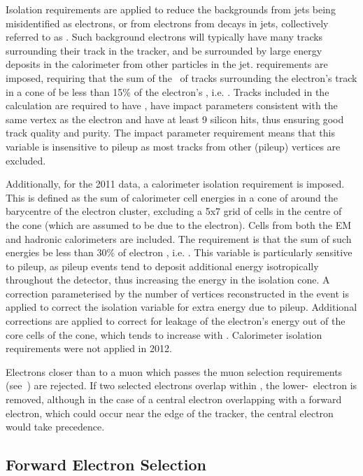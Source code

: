 Isolation requirements are applied to reduce the backgrounds from jets being
misidentified as electrons, or from electrons from decays in jets, collectively
referred to as . Such background electrons will
typically have many tracks surrounding their track in the tracker, and be
surrounded by large energy deposits in the calorimeter from other particles in
the jet.  requirements are imposed, requiring that the
sum of the \pt\ of tracks surrounding the electron's track in a cone of
 be less than 15\% of the electron's \pt, i.e.
. Tracks included in the calculation are required to have
, have impact parameters consistent with the same vertex as the
electron and have at least 9 silicon hits, thus ensuring good track quality and
purity. The impact parameter requirement means that this variable is insensitive
to pileup as most tracks from other (pileup) vertices are excluded.

Additionally, for the 2011 data, a calorimeter isolation requirement is imposed.
This is defined as the sum of calorimeter cell energies in a cone of
 around the barycentre of the electron cluster, excluding a 5x7
grid of cells in the centre of the cone (which are assumed to be due to the
electron). Cells from both the EM and hadronic calorimeters are included. The
requirement is that the sum of such energies be less than 30\% of electron \et,
i.e. .  This variable is particularly sensitive to pileup,
as pileup events tend to deposit additional energy isotropically throughout the
detector, thus increasing the energy in the isolation cone. A correction
parameterised by the number of vertices reconstructed in the event is applied to
correct the isolation variable for extra energy due to pileup.  Additional
corrections are applied to correct for leakage of the electron's energy out of
the core cells of the cone, which tends to increase with \pt. Calorimeter
isolation requirements were not applied in 2012.

Electrons closer than  to a muon which passes the muon selection
requirements (see~) are rejected. If two selected electrons
overlap within , the lower-\et\ electron is removed, although in
the case of a central electron overlapping with a forward electron, which could
occur near the edge of the tracker, the central electron would take precedence.

\subsection{Forward Electron Selection}

